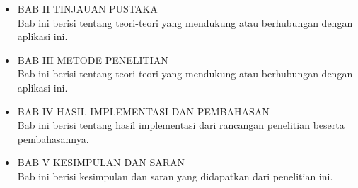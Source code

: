 \begin{flushleft}
\begin{justify}
\begin{itemize}
        \item BAB II TINJAUAN PUSTAKA
        \\
          Bab ini berisi tentang teori-teori yang mendukung atau berhubungan dengan aplikasi ini.
        \item BAB III METODE PENELITIAN
        \\
          Bab ini berisi tentang teori-teori yang mendukung atau berhubungan dengan aplikasi ini.
        \item BAB IV HASIL IMPLEMENTASI DAN PEMBAHASAN
        \\
          Bab ini berisi tentang hasil implementasi dari rancangan penelitian beserta pembahasannya.
        \item BAB V KESIMPULAN DAN SARAN
        \\
          Bab ini berisi kesimpulan dan saran yang didapatkan dari penelitian ini.
        \\
      \end{itemize}

  \end{justify}

\end{flushleft}
\newpage